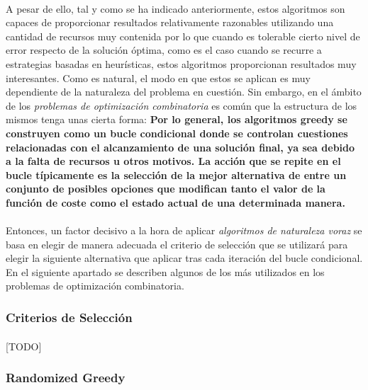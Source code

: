 \documentclass{subfiles}
\begin{document}
        \paragraph{}
        A pesar de ello, tal y como se ha indicado anteriormente, estos algoritmos son capaces de proporcionar resultados relativamente razonables utilizando una cantidad de recursos muy contenida por lo que cuando es tolerable cierto nivel de error respecto de la solución óptima, como es el caso cuando se recurre a estrategias basadas en heurísticas, estos algoritmos proporcionan resultados muy interesantes. Como es natural, el modo en que estos se aplican es muy dependiente de la naturaleza del problema en cuestión. Sin embargo, en el ámbito de los \emph{problemas de optimización combinatoria} es común que la estructura de los mismos tenga unas cierta forma: \textbf{Por lo general, los algoritmos greedy se construyen como un bucle condicional donde se controlan cuestiones relacionadas con el alcanzamiento de una solución final, ya sea debido a la falta de recursos u otros motivos. La acción que se repite en el bucle típicamente es la selección de la mejor alternativa de entre un conjunto de posibles opciones que modifican tanto el valor de la función de coste como el estado actual de una determinada manera.}

        \paragraph{}
        Entonces, un factor decisivo a la hora de aplicar \emph{algoritmos de naturaleza voraz} se basa en elegir de manera adecuada el criterio de selección que se utilizará para elegir la siguiente alternativa que aplicar tras cada iteración del bucle condicional. En el siguiente apartado se describen algunos de los más utilizados en los problemas de optimización combinatoria.

        \subsubsection{Criterios de Selección}
        \label{sec:solving_greedy_criterions}

          \paragraph{}
          [TODO]

        \subsubsection{Randomized Greedy}
        \label{sec:solving_randomized_greedy}
\end{document}
